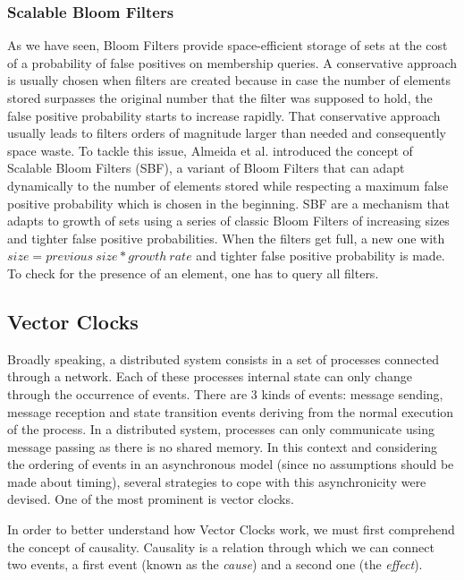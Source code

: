 \subsubsection{Scalable Bloom Filters}
\label{sec:scal-bloom-filt}

As we have seen, Bloom Filters provide space-efficient storage of sets
at the cost of a probability of false positives on membership queries.
A conservative approach is usually chosen when filters are created
because in case the number of elements stored surpasses the original
number that the filter was supposed to hold, the false positive
probability starts to increase rapidly. That conservative approach
usually leads to filters orders of magnitude larger than needed and
consequently space waste. To tackle this issue, Almeida et
al. \cite{Almeida2007} introduced the concept of Scalable Bloom Filters
(SBF), a variant of Bloom Filters that can adapt dynamically to the
number of elements stored while respecting a maximum false positive
probability which is chosen in the beginning. SBF are a mechanism that
adapts to growth of sets using a series of classic Bloom Filters of
increasing sizes and tighter false positive probabilities. When the
filters get full, a new one with $size = previous\ size*growth\ rate$
and tighter false positive probability is made. To check for the
presence of an element, one has to query all filters.

\subsection{Vector Clocks}
\label{sec:vector_clocks}

Broadly speaking, a distributed system consists in a set of processes
connected through a network. Each of these processes internal state can only
change through the occurrence of events. There are 3 kinds of events: message
sending, message reception and state transition events deriving from the
normal execution of the process. In a distributed system, processes can only
communicate using message passing as there is no shared memory. In this
context and considering the ordering of events in an asynchronous model (since
no assumptions should be made about timing), several strategies to cope with
this asynchronicity were devised. One of the most prominent is vector clocks.

In order to better understand how Vector Clocks work, we must first comprehend
the concept of causality.  Causality is a relation through which we can connect
two events, a first event (known as the \textit{cause}) and a second one (the
\textit{effect}).

